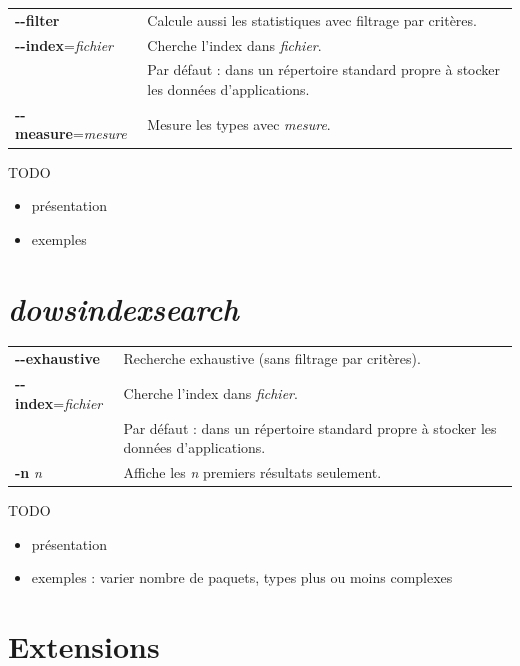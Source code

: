 \documentclass [a4paper] {report}
\theoremstyle {definition}
\newcommand {\dowsindex} {\textit{dowsindex}\xspace}
\begin{document}
\begin {table} [h]
\begin {tabular} {ll}
		\textbf {-{}-filter} &
		Calcule aussi les statistiques avec filtrage par critères.
	\\
		\textbf{-{}-index}=\textit{fichier} &
		Cherche l'index dans \textit {fichier}. \\ &
		Par défaut : dans un répertoire standard propre à stocker les données d'applications.
	\\
		\textbf{-{}-measure}=\textit{mesure} &
		Mesure les types avec \textit {mesure}.
\end {tabular}
\end {table}

TODO
\begin {itemize}
	\item présentation
	\item exemples
\end {itemize}

\section {\dowsindex \textit {search}}

\begin {table} [h]
\begin {tabular} {ll}
		\textbf {-{}-exhaustive} &
		Recherche exhaustive (sans filtrage par critères).
	\\
		\textbf{-{}-index}=\textit{fichier} &
		Cherche l'index dans \textit {fichier}. \\ &
		Par défaut : dans un répertoire standard propre à stocker les données d'applications.
	\\
		\textbf {-n} \textit {n} &
		Affiche les \textit {n} premiers résultats seulement.
\end {tabular}
\end {table}

TODO
\begin {itemize}
	\item présentation
	\item exemples : varier nombre de paquets, types plus ou moins complexes
\end {itemize}

\section {Extensions}
\end{document}
